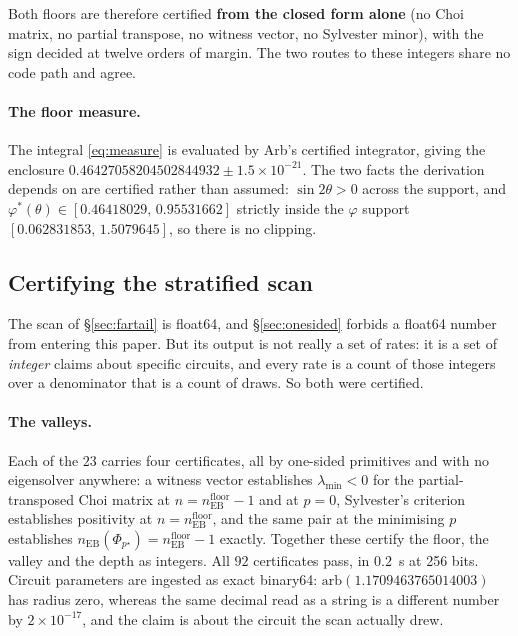 \documentclass[11pt,a4paper]{article}
\theoremstyle{definition}
\theoremstyle{remark}
\newcommand{\nEB}{n_{\mathrm{EB}}}
\newcommand{\floor}{n_{\mathrm{EB}}^{\mathrm{floor}}}
\begin{document}
Both floors are therefore certified \textbf{from the closed form alone} (no Choi matrix, no partial transpose, no witness vector, no Sylvester minor), with the sign decided at twelve orders of margin. The two routes to these integers share no code path and agree.

\paragraph{The floor measure.} The integral \eqref{eq:measure} is evaluated by Arb's certified integrator, giving the enclosure $0.46427058204502844932 \pm 1.5\times10^{-21}$. The two facts the derivation depends on are certified rather than assumed: $\sin2\theta > 0$ across the support, and $\varphi^*(\theta) \in [0.46418029,\,0.95531662]$ strictly inside the $\varphi$ support $[0.062831853,\,1.5079645]$, so there is no clipping.

\subsection{Certifying the stratified scan}\label{sec:scan3cert}

The scan of \S\ref{sec:fartail} is float64, and \S\ref{sec:onesided} forbids a float64 number from entering this paper. But its output is not really a set of rates: it is a set of \emph{integer} claims about specific circuits, and every rate is a count of those integers over a denominator that is a count of draws. So both were certified.

\paragraph{The valleys.} Each of the $23$ carries four certificates, all by one-sided primitives and with no eigensolver anywhere: a witness vector establishes $\lambda_{\min} < 0$ for the partial-transposed Choi matrix at $n = \floor-1$ and at $p = 0$, Sylvester's criterion establishes positivity at $n = \floor$, and the same pair at the minimising $p$ establishes $\nEB(\Phi_{p^\star}) = \floor - 1$ exactly. Together these certify the floor, the valley and the depth as integers. All $92$ certificates pass, in $0.2$~s at 256 bits. Circuit parameters are ingested as exact binary64: $\mathrm{arb}(1.1709463765014003)$ has radius zero, whereas the same decimal read as a string is a different number by $2\times10^{-17}$, and the claim is about the circuit the scan actually drew.
\end{document}
